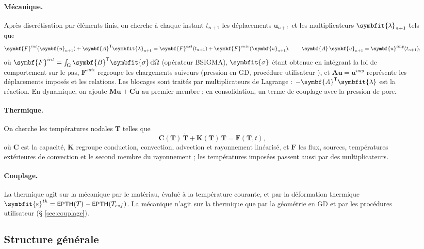 \documentclass[11pt,a4paper]{article}
\numberwithin{equation}{section}
\newcommand{\src}[1]{\texttt{\detokenize{#1}}}          %
\newcommand{\op}[1]{\textsf{\small #1}}                 %
\newcommand{\vc}[1]{\symbf{#1}}                         %
\newcommand{\eps}{\varepsilon}
\newcommand{\sig}{\symbfit{\sigma}}
\newcommand{\vg}[1]{\symbfit{#1}}                       %
\begin{document}
\paragraph{Mécanique.}
Après discrétisation par éléments finis, on cherche à chaque instant $t_{n+1}$ les déplacements $\vc u_{n+1}$ et les multiplicateurs $\vg\lambda_{n+1}$ tels que
\begin{equation}
\label{eq:equilibre}
\vc F^{int}(\vc u_{n+1}) + \vc A^{\mathsf T}\vg\lambda_{n+1} = \vc F^{ext}(t_{n+1}) + \vc F^{suiv}(\vc u_{n+1}),
\qquad
\vc A\,\vc u_{n+1} = \vc u^{imp}(t_{n+1}),
\end{equation}
où $\vc F^{int} = \int_\Omega \vc B^{\mathsf T}\sig\,\mathrm d\Omega$ (opérateur \op{BSIGMA}), $\sig$ étant obtenue en intégrant la loi de comportement sur le pas, $\vc F^{suiv}$ regroupe les chargements suiveurs (pression en GD, procédure utilisateur \src{CHARMECA}), et $\vc A\vc u = \vc u^{imp}$ représente les déplacements imposés et les relations.
Les blocages sont traités par multiplicateurs de Lagrange : $-\vc A^{\mathsf T}\vg\lambda$ est la réaction.
En dynamique, on ajoute $\vc M\ddot{\vc u} + \vc C\dot{\vc u}$ au premier membre ; en consolidation, un terme de couplage avec la pression de pore.

\paragraph{Thermique.}
On cherche les températures nodales $\vc T$ telles que
\begin{equation}
\label{eq:thermique}
\vc C(\vc T)\,\dot{\vc T} + \vc K(\vc T)\,\vc T = \vc F(\vc T, t),
\end{equation}
où $\vc C$ est la capacité, $\vc K$ regroupe conduction, convection, advection et rayonnement linéarisé, et $\vc F$ les flux, sources, températures extérieures de convection et le second membre du rayonnement ; les températures imposées passent aussi par des multiplicateurs.

\paragraph{Couplage.}
La thermique agit sur la mécanique par le matériau, évalué à la température courante, et par la déformation thermique $\vg\eps^{th} = \op{EPTH}(T) - \op{EPTH}(T_{ref})$.
La mécanique n'agit sur la thermique que par la géométrie en GD et par les procédures utilisateur (§ \ref{sec:couplage}).

\subsection{Structure générale}
\end{document}
